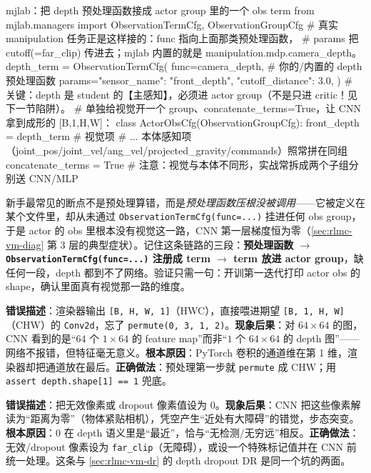 \begin{codebox}[Python]{mjlab：把 depth 预处理函数接成 actor group 里的一个 obs term}
from mjlab.managers import ObservationTermCfg, ObservationGroupCfg
# 真实 manipulation 任务正是这样接的：func 指向上面那类预处理函数，
# params 把 cutoff(=far_clip) 传进去；mjlab 内置的就是 manipulation.mdp.camera_depth。
depth_term = ObservationTermCfg(
    func=camera_depth,                      # 你的/内置的 depth 预处理函数
    params={"sensor_name": "front_depth", "cutoff_distance": 3.0},
)
# 关键：depth 是 student 的【主感知】，必须进 actor group（不是只进 critic！见下一节陷阱）。
# 单独给视觉开一个 group、concatenate_terms=True，让 CNN 拿到成形的 [B,1,H,W]：
class ActorObsCfg(ObservationGroupCfg):
    front_depth = depth_term                # 视觉项
    # ... 本体感知项（joint_pos/joint_vel/ang_vel/projected_gravity/commands）照常拼在同组
    concatenate_terms = True                # 注意：视觉与本体不同形，实战常拆成两个子组分别送 CNN/MLP
\end{codebox}

\begin{insight}\label{ins:rlmc-vm-wire}
新手最常见的断点不是预处理算错，而是\emph{预处理函数压根没被调用}——它被定义在某个文件里，却从未通过 \verb|ObservationTermCfg(func=...)| 挂进任何 obs group，于是 actor 的 obs 里根本没有视觉这一路，CNN 第一层梯度恒为零（\cref{sec:rlmc-vm-diag} 第 3 层的典型症状）。记住这条链路的三段：\textbf{预处理函数 $\to$ \texttt{ObservationTermCfg(func=...)} 注册成 term $\to$ term 放进 actor group}，缺任何一段，depth 都到不了网络。验证只需一句：开训第一迭代打印 actor obs 的 shape，确认里面真有视觉那一路的维度。
\end{insight}

\begin{pitfall}
\textbf{错误描述}：渲染器输出 \verb|[B, H, W, 1]|（HWC），直接喂进期望 \verb|[B, 1, H, W]|（CHW）的 \verb|Conv2d|，忘了 \verb|permute(0, 3, 1, 2)|。\textbf{现象后果}：对 $64\times64$ 的图，CNN 看到的是“$64$ 个 $1\times64$ 的 feature map”而非“$1$ 个 $64\times64$ 的 depth 图”——网络不报错，但特征毫无意义。\textbf{根本原因}：PyTorch 卷积的通道维在第 1 维，渲染器却把通道放在最后。\textbf{正确做法}：预处理第一步就 \verb|permute| 成 CHW；用 \verb|assert depth.shape[1] == 1| 兜底。
\end{pitfall}

\begin{pitfall}
\textbf{错误描述}：把无效像素或 dropout 像素值设为 $0$。\textbf{现象后果}：CNN 把这些像素解读为“距离为零”（物体紧贴相机），凭空产生“近处有大障碍”的错觉，步态突变。\textbf{根本原因}：$0$ 在 depth 语义里是“最近”，恰与“无检测/无穷远”相反。\textbf{正确做法}：无效/dropout 像素设为 \verb|far_clip|（无障碍），或设一个特殊标记值并在 CNN 前统一处理。这条与 \cref{sec:rlmc-vm-dr} 的 depth dropout DR 是同一个坑的两面。
\end{pitfall}

